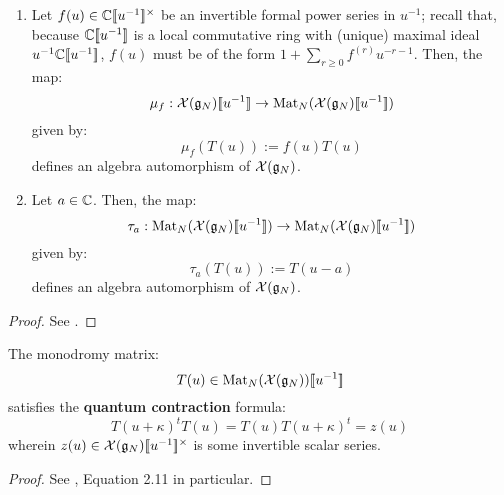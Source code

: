         \begin{lemma} \label{lemma: automorphisms_of_extended_untwisted_yangians}
            \begin{enumerate}
                \item Let $f(u) \in \bbC[\![u^{-1}]\!]^{\x}$ be an invertible formal power series in $u^{-1}$; recall that, because $\mathbb{C}[\![u^{-1}]\!]$ is a local commutative ring with (unique) maximal ideal $u^{-1}\mathbb{C}[\![u^{-1}]\!]$, $f(u)$ must be of the form $1 + \sum_{r \geq 0} f^{(r)} u^{-r - 1}$. Then, the map:
                    $$\mu_f: \mathcal{X}(\mathfrak{g}_N)[\![u^{-1}]\!] \to \operatorname{Mat}_N(\mathcal{X}(\mathfrak{g}_N)[\![u^{-1}]\!])$$
                given by:
                    $$\mu_f( T(u) ) := f(u) T(u)$$
                defines an algebra automorphism of $\mathcal{X}(\mathfrak{g}_N)$.
                \item Let $a \in \mathbb{C}$. Then, the map:
                    $$\tau_a: \operatorname{Mat}_N(\mathcal{X}(\mathfrak{g}_N)[\![u^{-1}]\!]) \to \operatorname{Mat}_N(\mathcal{X}(\mathfrak{g}_N)[\![u^{-1}]\!])$$
                given by:
                    $$\tau_a( T(u) ) := T(u - a)$$
                defines an algebra automorphism of $\mathcal{X}(\mathfrak{g}_N)$.
            \end{enumerate}
        \end{lemma}
            \begin{proof}
                See \cite[Section 2]{guay_regelskis_twisted_yangians_for_symmetric_pairs_of_types_BCD}.
            \end{proof}

        \begin{lemma} \label{lemma: quantum_contractions}
            The monodromy matrix:
                $$T(u) \in \operatorname{Mat}_N( \mathcal{X}(\mathfrak{g}_N) )[\![u^{-1}]\!]$$
            satisfies the \textbf{quantum contraction} formula:
                \begin{equation} \label{equation: quantum_contraction}
                    T(u + \kappa)^t T(u) = T(u) T(u + \kappa)^t = z(u)
                \end{equation}
            wherein $z(u) \in \calX(\g_N)[\![u^{-1}]\!]^{\x}$ is some invertible scalar series.
        \end{lemma}
            \begin{proof}
                See \cite[Section 2]{guay_regelskis_twisted_yangians_for_symmetric_pairs_of_types_BCD}, Equation 2.11 in particular.
            \end{proof}
            
